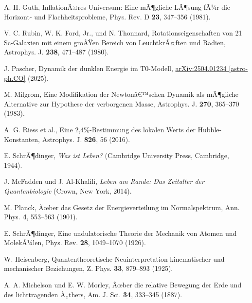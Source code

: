 ﻿\documentclass[twocolumn,aps,prl]{revtex4-2}
\begin{document}
{{{{{{{{{{{{{{{{\begin{thebibliography}{99}
																				 A. H. Guth, InflationÃ¤res Universum: Eine mÃ¶gliche LÃ¶sung fÃ¼r die Horizont- und Flachheitsprobleme, Phys. Rev. D \textbf{23}, 347--356 (1981).
																				
																				 V. C. Rubin, W. K. Ford, Jr., und N. Thonnard, Rotationseigenschaften von 21 Sc-Galaxien mit einem groÃŸen Bereich von LeuchtkrÃ¤ften und Radien, Astrophys. J. \textbf{238}, 471--487 (1980).
																				
																				 J. Pascher, Dynamik der dunklen Energie im T0-Modell, \href{https://github.com/jpascher/T0-Time-Mass-Duality/tree/main/2/pdf/Deutsch/DunkleEnergieT0.pdf}{arXiv:2504.01234 [astro-ph.CO]} (2025).
																				
																				 M. Milgrom, Eine Modifikation der Newtonâ€™schen Dynamik als mÃ¶gliche Alternative zur Hypothese der verborgenen Masse, Astrophys. J. \textbf{270}, 365--370 (1983).
																				
																				 A. G. Riess et al., Eine 2,4\%-Bestimmung des lokalen Werts der Hubble-Konstanten, Astrophys. J. \textbf{826}, 56 (2016).
																				
																				 E. SchrÃ¶dinger, \textit{Was ist Leben?} (Cambridge University Press, Cambridge, 1944).
																				
																				 J. McFadden und J. Al-Khalili, \textit{Leben am Rande: Das Zeitalter der Quantenbiologie} (Crown, New York, 2014).
																				
																				 M. Planck, Ãœber das Gesetz der Energieverteilung im Normalspektrum, Ann. Phys. \textbf{4}, 553--563 (1901).
																				
																				 E. SchrÃ¶dinger, Eine undulatorische Theorie der Mechanik von Atomen und MolekÃ¼len, Phys. Rev. \textbf{28}, 1049--1070 (1926).
																				
																				 W. Heisenberg, Quantentheoretische Neuinterpretation kinematischer und mechanischer Beziehungen, Z. Phys. \textbf{33}, 879--893 (1925).
																				
																				 A. A. Michelson und E. W. Morley, Ãœber die relative Bewegung der Erde und des lichttragenden Ã„thers, Am. J. Sci. \textbf{34}, 333--345 (1887).
																				

\end{thebibliography}}}}}}}}}}}}}}}}}
\end{document}

